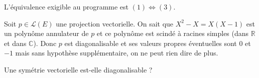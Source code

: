 \documentclass[french,11pt,twoside]{VcCours}
\begin{document}
 \begin{Demonstration}{} L'équivalence exigible au programme est $(1) \Longleftrightarrow (3)$.
 
% 
% 

\vspace{15cm}
 \end{Demonstration}
 
 \phantom{test}
 
 \vspace{6cm}
  
 \begin{Exemple}{} Soit $p \in \mathcal{L}(E)$ une projection vectorielle. On sait que $X^2-X=X(X-1)$ est un polynôme annulateur de $p$ et ce polynôme est scindé à racines simples (dans $\mathbb{R}$ et dans $\mathbb{C}$). Donc $p$ est diagonalisable et ses valeurs propres éventuelles sont $0$ et $-1$ mais sans hypothèse supplémentaire, on ne peut rien dire de plus.
 \end{Exemple}
 
 \begin{ApplicationDirecte}{} Une symétrie vectorielle est-elle diagonalisable ?
 \end{ApplicationDirecte}
 
\end{document}
